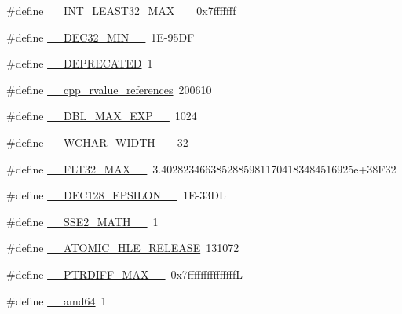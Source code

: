 \begin{DoxyCompactItemize}
\item 
\#define \hyperlink{cmake-build-debug_2babel__client__autogen_2moc__predefs_8h_a97e13c059a63d2d547cc4a9f386641d2}{\+\_\+\+\_\+\+I\+N\+T\+\_\+\+L\+E\+A\+S\+T32\+\_\+\+M\+A\+X\+\_\+\+\_\+}~0x7fffffff
\item 
\#define \hyperlink{cmake-build-debug_2babel__client__autogen_2moc__predefs_8h_a1f993b902b5b1dba7d5b043d0abc347b}{\+\_\+\+\_\+\+D\+E\+C32\+\_\+\+M\+I\+N\+\_\+\+\_\+}~1\+E-\/95\+DF
\item 
\#define \hyperlink{cmake-build-debug_2babel__client__autogen_2moc__predefs_8h_aa806e8f7ce2a8db3bf676735fca2ac51}{\+\_\+\+\_\+\+D\+E\+P\+R\+E\+C\+A\+T\+ED}~1
\item 
\#define \hyperlink{cmake-build-debug_2babel__client__autogen_2moc__predefs_8h_acfffb302850fa081bd63c30573077004}{\+\_\+\+\_\+cpp\+\_\+rvalue\+\_\+references}~200610
\item 
\#define \hyperlink{cmake-build-debug_2babel__client__autogen_2moc__predefs_8h_a9a8a7cd9484baf4b72ab15682745d119}{\+\_\+\+\_\+\+D\+B\+L\+\_\+\+M\+A\+X\+\_\+\+E\+X\+P\+\_\+\+\_\+}~1024
\item 
\#define \hyperlink{cmake-build-debug_2babel__client__autogen_2moc__predefs_8h_aba008af276ac0e3f85d1479af98f62b0}{\+\_\+\+\_\+\+W\+C\+H\+A\+R\+\_\+\+W\+I\+D\+T\+H\+\_\+\+\_\+}~32
\item 
\#define \hyperlink{cmake-build-debug_2babel__client__autogen_2moc__predefs_8h_a8d44614ef6d7f2bbbd9224d416d867b9}{\+\_\+\+\_\+\+F\+L\+T32\+\_\+\+M\+A\+X\+\_\+\+\_\+}~3.\+40282346638528859811704183484516925e+38\+F32
\item 
\#define \hyperlink{cmake-build-debug_2babel__client__autogen_2moc__predefs_8h_abd2230e0e187a5bae549a0ba786b311b}{\+\_\+\+\_\+\+D\+E\+C128\+\_\+\+E\+P\+S\+I\+L\+O\+N\+\_\+\+\_\+}~1\+E-\/33\+DL
\item 
\#define \hyperlink{cmake-build-debug_2babel__client__autogen_2moc__predefs_8h_ad8885a68f76fac734a20349f9b8cac69}{\+\_\+\+\_\+\+S\+S\+E2\+\_\+\+M\+A\+T\+H\+\_\+\+\_\+}~1
\item 
\#define \hyperlink{cmake-build-debug_2babel__client__autogen_2moc__predefs_8h_a6bb8315e719b7306f47cde3b4b30d91f}{\+\_\+\+\_\+\+A\+T\+O\+M\+I\+C\+\_\+\+H\+L\+E\+\_\+\+R\+E\+L\+E\+A\+SE}~131072
\item 
\#define \hyperlink{cmake-build-debug_2babel__client__autogen_2moc__predefs_8h_ac29c76a6702808cfc4a5f661d0d33c2c}{\+\_\+\+\_\+\+P\+T\+R\+D\+I\+F\+F\+\_\+\+M\+A\+X\+\_\+\+\_\+}~0x7fffffffffffffffL
\item 
\#define \hyperlink{cmake-build-debug_2babel__client__autogen_2moc__predefs_8h_ac78e83c300ae463c501bbe70c5a2a8c7}{\+\_\+\+\_\+amd64}~1

\end{DoxyCompactItemize}
